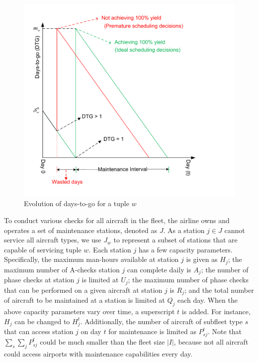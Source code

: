 

\begin{figure}[ht]
    \centering
    \includegraphics[width=0.65\linewidth]{Daystogo_v2.pdf}    
    \caption{Evolution of days-to-go for a tuple $w$}
    \label{fig:maint_cycle}
\end{figure}


To conduct various checks for all aircraft in the fleet, the airline owns and operates a set of maintenance stations, denoted as $J$. As a station $j \in J$ cannot service all aircraft types, we use $J_w$ to represent a subset of stations that are capable of servicing tuple $w$. Each station $j$ has a few capacity parameters. Specifically, the maximum man-hours available at station $j$ is given as $H_j$; the maximum number of A-checks station $j$ can complete daily is $A_j$; the number of phase checks at station $j$ is limited at $U_j$; the maximum number of phase checks that can be performed on a given aircraft at station $j$ is $R_j$; and the total number of aircraft to be maintained at a station is limited at $Q_j$ each day. When the above capacity parameters vary over time, a superscript $t$ is added. For instance, $H_j$ can be changed to $H_j^t$. Additionally, the number of aircraft of subfleet type $s$ that can access station $j$ on day $t$ for maintenance is limited as $P_{sj}^t$. Note that $\sum_s\sum_jP_{sj}^t$ could be much smaller than the fleet size $|I|$, because not all aircraft could access airports with maintenance capabilities every day. 

